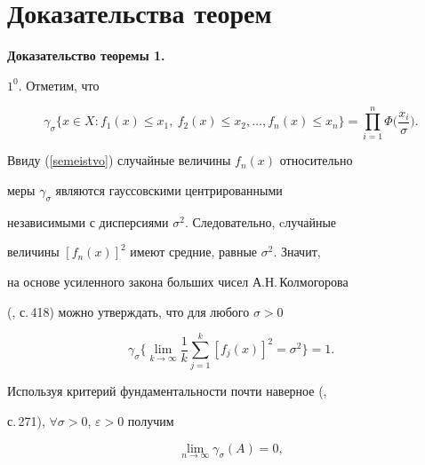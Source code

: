 \section{Доказательства теорем}








{\bf Доказательство теоремы 1.}


$1^0$. Отметим, что


\begin{equation}


\gamma_\sigma\big\{x\in X:f_1(x)\le x_1,\ f_2(x)\le


x_2,\dotsc,f_n(x)\le x_n\big\}=


\prod_{i=1}^n\Phi\bigg(\frac{x_i}\sigma\bigg).


\label{semeistvo}


\end{equation}


Ввиду (\ref{semeistvo}) случайные величины $f_n(x)$ относительно


меры $\gamma_\sigma$ являются гауссовскими центрированными


независимыми с дисперсиями $\sigma^2$. Следовательно, cлучайные


величины $[f_n(x)]^2$ имеют средние, равные $\sigma^2$. Значит,


на основе усиленного закона больших чисел А.Н.\,Колмогорова 


(\cite{Shir}, с.\,418) можно утверждать, что для любого $\sigma>0$


\begin{equation*}


\gamma_\sigma\bigg\{\lim_{k\to\infty}\frac1k


\sum_{j=1}^k[f_j(x)]^2=\sigma^2\bigg\}=1.




\end{equation*}


Используя критерий фундаментальности почти наверное (\cite{Shir},


с.\,271), $\forall\sigma>0$, $\varepsilon>0$ получим


\begin{equation}


\lim_{n\to\infty}\gamma_\sigma (A)=0,


\label{mualphato0}


\end{equation}


